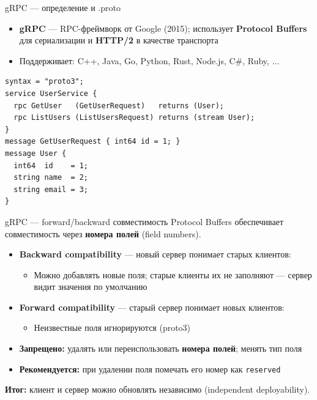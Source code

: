 \documentclass{beamer}
\begin{document}
\begin{frame}[fragile]{gRPC --- определение и .proto}
\begin{itemize}
  \item \textbf{gRPC} --- RPC-фреймворк от Google (2015); использует \textbf{Protocol Buffers} для сериализации и \textbf{HTTP/2} в качестве транспорта
  \item Поддерживает: C++, Java, Go, Python, Rust, Node.js, C\#, Ruby, ...
\end{itemize}
\begin{verbatim}
syntax = "proto3";
service UserService {
  rpc GetUser   (GetUserRequest)   returns (User);
  rpc ListUsers (ListUsersRequest) returns (stream User);
}
message GetUserRequest { int64 id = 1; }
message User {
  int64  id    = 1;
  string name  = 2;
  string email = 3;
}
\end{verbatim}
\end{frame}

\begin{frame}{gRPC --- forward/backward совместимость}
Protocol Buffers обеспечивает совместимость через \textbf{номера полей} (field numbers).
\begin{itemize}
  \item \textbf{Backward compatibility} --- новый сервер понимает старых клиентов:
  \begin{itemize}
    \item Можно добавлять новые поля; старые клиенты их не заполняют --- сервер видит значения по умолчанию
  \end{itemize}
  \item \textbf{Forward compatibility} --- старый сервер понимает новых клиентов:
  \begin{itemize}
    \item Неизвестные поля игнорируются (proto3)
  \end{itemize}
  \item \textbf{Запрещено:} удалять или переиспользовать \textbf{номера полей}; менять тип поля
  \item \textbf{Рекомендуется:} при удалении поля помечать его номер как \texttt{reserved}
\end{itemize}
\vspace{0.2cm}
\textbf{Итог:} клиент и сервер можно обновлять независимо (independent deployability).
\end{frame}
\end{document}
